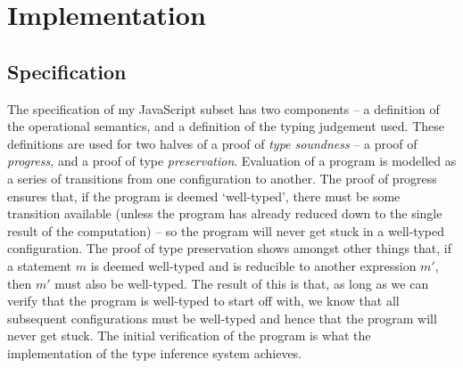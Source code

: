 \documentclass[12pt,a4paper,twoside,openright]{report}
\begin{document}
\chapter{Implementation}\label{implementation}

\section{Specification} The specification of my JavaScript subset has two
components -- a definition of the operational semantics, and a definition of
the typing judgement used. These definitions are used for two halves of a proof
of \textit{type soundness} -- a proof of \textit{progress}, and a proof of type
\textit{preservation}.  Evaluation of a program is modelled as a series of
transitions from one configuration to another. The proof of progress ensures
that, if the program is deemed `well-typed', there must be some transition
available (unless the program has already reduced down to the single result of
the computation) -- so the program will never get stuck in a well-typed
configuration. The proof of type preservation shows amongst other things that,
if a statement $m$ is deemed well-typed and is reducible to another expression
$m'$, then $m'$ must also be well-typed. The result of this is that, as long as
we can verify that the program is well-typed to start off with, we know that
all subsequent configurations must be well-typed and hence that the program
will never get stuck. The initial verification of the program is what the
implementation of the type inference system achieves.
\end{document}
